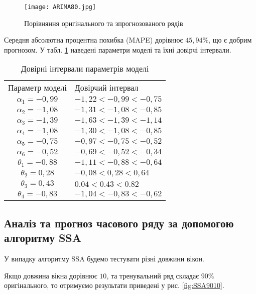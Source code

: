 \newpage

\vspace{1em}

\begin{figure}[h]
  \texttt{[image: ARIMA80.jpg]}
  \caption{Порівняння оригінального та зпрогнозованого рядів}
  \label{fig:ARIMA80}
\end{figure}

Середня абсолютна процентна похибка (MAPE) дорівнює $45,94\%$, що є добрим прогнозом. У табл. \ref{tab:ARIMA80} наведені параметри моделі та їхні довірчі інтервали.

\begin{table}[h]
\caption{Довірні інтервали параметрів моделі}\label{tab:ARIMA80}
\begin{tabular}{|c|m{}|}
\hline
Параметр моделі & Довірчий інтервал \\
		\hlinewd{2pt}
$\alpha_{1} = -0,99$ & $-1,22 < -0,99 < -0,75$ \\
\hline
$\alpha_{2} = -1,08$ & $-1,31 < -1,08 < -0,85$ \\
\hline
$\alpha_{3} = -1,39$ & $-1,63 < -1,39 < -1,14$ \\
\hline
$\alpha_{4} = -1,08$ & $-1,30 < -1,08 < -0,85$ \\
\hline
$\alpha_{5} = -0,75$ & $-0,97 < -0,75 < -0,52$ \\
\hline
$\alpha_{6} = -0,52$ & $-0,69 < -0,52 < -0,34$ \\
\hline
$\theta_{1} = -0,88$ & $-1,11 < -0,88 < -0,64$ \\
\hline
$\theta_{2} = 0,28$ & $-0,08 < 0,28 < 0,64$ \\
\hline
$\theta_{3} = 0,43$ & $0.04 < 0.43 < 0.82$ \\
\hline
$\theta_{4} = -0,83$ & $-1,04 < -0,83 < -0,62$ \\
\hline
\end{tabular}
\end{table}

\subsection{Аналіз та прогноз часового ряду за допомогою алгоритму SSA}

У випадку алгоритму SSA будемо тестувати різні довжини вікон.

Якщо довжина вікна дорівнює $10$, та тренувальний ряд складає $90\%$ оригінального, то отримуємо результати приведені у рис. \ref{fig:SSA9010}.

